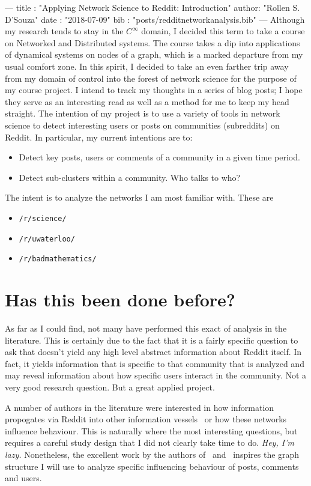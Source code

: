 ---
title :   "Applying Network Science to Reddit: Introduction"
author:   "Rollen S. D'Souza"
date  :   "2018-07-09"
bib   :   "posts/redditnetworkanalysis.bib"
---
Although my research tends to stay in the \(C^\infty\) domain, I decided this term to take a course on Networked and Distributed systems.
The course takes a dip into applications of dynamical systems on nodes of a graph, which is a marked departure from my usual comfort zone.
In this spirit, I decided to take an even farther trip away from my domain of control into the forest of network science for the purpose of my course project.
I intend to track my thoughts in a series of blog posts;
I hope they serve as an interesting read as well as a method for me to keep my head straight.
The intention of my project is to use a variety of tools in network science to detect interesting users or posts on communities (subreddits) on Reddit.
In particular, my current intentions are to:
%
\begin{itemize}
 \item{Detect key posts, users or comments of a community in a given time period.}
 \item{Detect sub-clusters within a community. Who talks to who?}
\end{itemize}
%
The intent is to analyze the networks I am most familiar with.
These are
%
\begin{itemize}
  \item{\texttt{/r/science/}}
  \item{\texttt{/r/uwaterloo/}}
  \item{\texttt{/r/badmathematics/}}
\end{itemize}
%

\section{Has this been done before?}
As far as I could find, not many have performed this exact of analysis in the literature.
This is certainly due to the fact that it is a fairly specific question to ask that doesn't yield any high level abstract information about Reddit itself.
In fact, it yields information that is specific to that community that is analyzed and may reveal information about how specific users interact in the community.
Not a very good research question.
But a great applied project.

A number of authors in the literature were interested in how information propogates via Reddit into other information vessels~\cite{c1} or how these networks influence behaviour.
This is naturally where the most interesting questions, but requires a careful study design that I did not clearly take time to do.
\emph{Hey, I'm lazy.}
Nonetheless, the excellent work by the authors of~\cite{c2} and~\cite{c3} inspires the graph structure I will use to analyze specific influencing behaviour of posts, comments and users.

